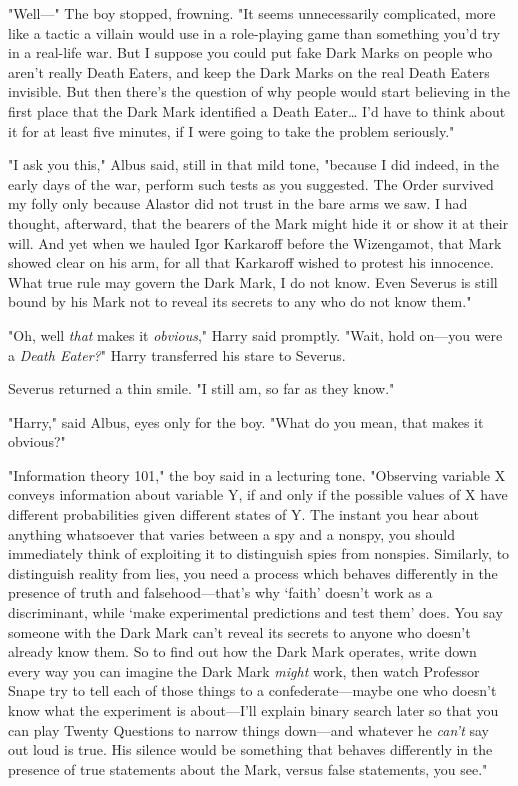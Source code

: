 "Well---" The boy stopped, frowning. "It seems unnecessarily complicated, more
like a tactic a villain would use in a role-playing game than something you'd
try in a real-life war. But I suppose you could put fake Dark Marks on people
who aren't really Death Eaters, and keep the Dark Marks on the real Death
Eaters invisible. But then there's the question of why people would start
believing in the first place that the Dark Mark identified a Death
Eater{\ldots} I'd have to think about it for at least five minutes, if I were
going to take the problem seriously."

"I ask you this," Albus said, still in that mild tone, "because I did indeed,
in the early days of the war, perform such tests as you suggested. The Order
survived my folly only because Alastor did not trust in the bare arms we saw. I
had thought, afterward, that the bearers of the Mark might hide it or show it
at their will. And yet when we hauled Igor Karkaroff before the Wizengamot, that
Mark showed clear on his arm, for all that Karkaroff wished to protest his
innocence. What true rule may govern the Dark Mark, I do not know. Even Severus
is still bound by his Mark not to reveal its secrets to any who do not know
them."

"Oh, well \emph{that} makes it \emph{obvious}," Harry said promptly. "Wait,
hold on---you were a \emph{Death Eater?}" Harry transferred his stare to
Severus.

Severus returned a thin smile. "I still am, so far as they know."

"Harry," said Albus, eyes only for the boy. "What do you mean, that makes it
obvious?"

"Information theory 101," the boy said in a lecturing tone. "Observing variable
X conveys information about variable Y, if and only if the possible values of X
have different probabilities given different states of Y\@. The instant you hear
about anything whatsoever that varies between a spy and a nonspy, you should
immediately think of exploiting it to distinguish spies from nonspies.
Similarly, to distinguish reality from lies, you need a process which behaves
differently in the presence of truth and falsehood---that's why `faith' doesn't
work as a discriminant, while `make experimental predictions and test them'
does. You say someone with the Dark Mark can't reveal its secrets to anyone who
doesn't already know them. So to find out how the Dark Mark operates, write
down every way you can imagine the Dark Mark \emph{might} work, then watch
Professor Snape try to tell each of those things to a confederate---maybe one
who doesn't know what the experiment is about---I'll explain binary search
later so that you can play Twenty Questions to narrow things down---and
whatever he \emph{can't} say out loud is true. His silence would be something
that behaves differently in the presence of true statements about the Mark,
versus false statements, you see."

